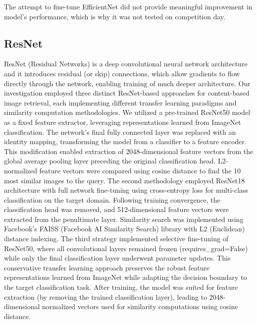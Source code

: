 The attempt to fine-tune EfficientNet did not provide meaningful improvement in model's performance, which is why it was not tested on competition day. 

\subsection{ResNet}

ResNet (Residual Networks) is a deep convolutional neural network architecture and it introduces residual (or skip) connections, which allow gradients to flow directly through the network, enabling training of much deeper architecture.
Our investigation employed three distinct ResNet-based approaches for content-based image retrieval, each implementing different transfer learning paradigms and similarity computation methodologies.
We utilized a pre-trained ResNet50 model as a fixed feature extractor, leveraging representations learned from ImageNet classification. 
The network's final fully connected layer was replaced with an identity mapping, transforming the model from a classifier to a feature encoder. This modification enabled extraction of 2048-dimensional feature vectors from the global average pooling layer preceding the original classification head.
L2-normalized feature vectors were compared using cosine distance to find the 10 most similar images to the query. 
The second methodology employed ResNet18 architecture with full network fine-tuning using cross-entropy loss for multi-class classification on the target domain. Following training convergence, the classification head was removed, and 512-dimensional feature vectors were extracted from the penultimate layer.
Similarity search was implemented using Facebook's FAISS (Facebook AI Similarity Search) library with L2 (Euclidean) distance indexing.
The third strategy implemented selective fine-tuning of ResNet50, where all convolutional layers remained frozen (requires\_grad=False) while only the final classification layer underwent parameter updates. 
This conservative transfer learning approach preserves the robust feature representations learned from ImageNet while adapting the decision boundary to the target classification task.
After training, the model was suited for feature extraction (by removing the trained classification layer), leading to 2048-dimensional normalized vectors used for similarity computations using cosine distance. 

